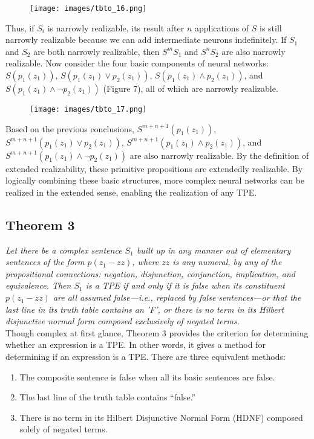 \documentclass[11p,oneside]{book}
\begin{document}
\begin{figure}[H]
    \centering
    \texttt{[image: images/tbto\_16.png]}
\end{figure}

Thus, if $S_i$ is narrowly realizable, its result after $n$ applications of $S$ is still narrowly realizable because we can add intermediate neurons indefinitely. If $S_1$ and $S_2$ are both narrowly realizable, then $S^m S_1$ and $S^n S_2$ are also narrowly realizable. Now consider the four basic components of neural networks: $S(p_1(z_1))$, $S(p_1(z_1) \lor p_2(z_1))$, $S(p_1(z_1) \land p_2(z_1))$, and $S(p_1(z_1) \land \lnot p_2(z_1))$ (Figure 7), all of which are narrowly realizable.\\


\begin{figure}[H]
    \centering
    \texttt{[image: images/tbto\_17.png]}
\end{figure}

Based on the previous conclusions, $S^{m+n+1}(p_1(z_1))$, $S^{m+n+1}(p_1(z_1) \lor p_2(z_1))$, $S^{m+n+1}(p_1(z_1) \land p_2(z_1))$, and $S^{m+n+1}(p_1(z_1) \land \lnot p_2(z_1))$ are also narrowly realizable. By the definition of extended realizability, these primitive propositions are extendedly realizable. By logically combining these basic structures, more complex neural networks can be realized in the extended sense, enabling the realization of any TPE.

\subsection*{Theorem 3}
\textit{Let there be a complex sentence $S_1$ built up in any manner out of elementary sentences of the form $p(z_1-zz)$, where $zz$ is any numeral, by any of the propositional connections: negation, disjunction, conjunction, implication, and equivalence. Then $S_1$ is a TPE if and only if it is false when its constituent $p(z_1-zz)$ are all assumed false—i.e., replaced by false sentences—or that the last line in its truth table contains an 'F', or there is no term in its Hilbert disjunctive normal form composed exclusively of negated terms.}
\\

Though complex at first glance, Theorem 3 provides the criterion for determining whether an expression is a TPE. In other words, it gives a method for determining if an expression is a TPE. There are three equivalent methods:
\begin{enumerate}
    \item The composite sentence is false when all its basic sentences are false.
    \item The last line of the truth table contains “false.”
    \item There is no term in its Hilbert Disjunctive Normal Form (HDNF) composed solely of negated terms.\\
\end{enumerate}
\end{document}

